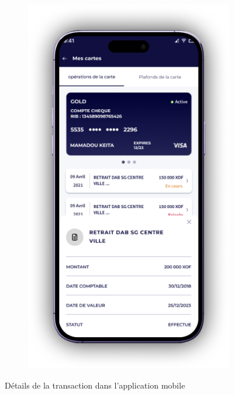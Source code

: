 \begin{figure}[!ht]
    \centering
    \begin{subfigure}[b]{0.49\textwidth}
        \centering
        \includegraphics[width=\textwidth]{images/screens/mobileApp/device/Cards Transactions Details D.png}
    \end{subfigure}
       \caption{Détails de la transaction dans l'application mobile}
\end{figure}

